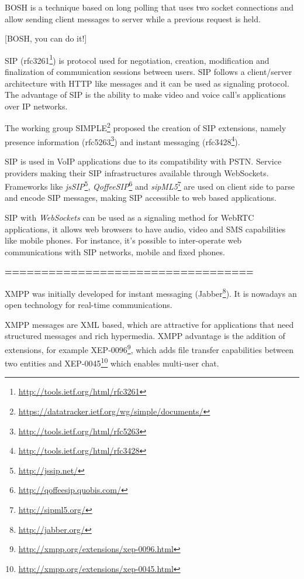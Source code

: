   \ac{BOSH} is a technique based on long polling that uses two socket connections and allow sending client messages to server while a previous request is held.

{\color{magenta} [BOSH, you can do it!]}

  \ac{SIP} (rfc3261\footnote{\url{http://tools.ietf.org/html/rfc3261}}) is protocol used for negotiation, creation, modification and finalization of communication sessions between users. \ac{SIP} follows a client/server architecture with \ac{HTTP} like messages and it can be used as signaling protocol. The advantage of \ac{SIP} is the ability to make video and voice call's applications over \ac{IP} networks.

  The working group \ac{SIMPLE}\footnote{\url{https://datatracker.ietf.org/wg/simple/documents/}} proposed the creation of \ac{SIP} extensions, namely presence information (rfc5263\footnote{\url{http://tools.ietf.org/html/rfc5263}}) and instant messaging (rfc3428\footnote{\url{http://tools.ietf.org/html/rfc3428}}).

  \ac{SIP} is used in \ac{VoIP} applications due to its compatibility with \ac{PSTN}. Service providers making their \ac{SIP} infrastructures available through WebSockets. Frameworks like \textit{jsSIP}\footnote{\url{http://jssip.net/}}, \textit{QoffeeSIP}\footnote{\url{http://qoffeesip.quobis.com/}} and \textit{sipML5}\footnote{\url{http://sipml5.org/}} are used on client side to parse and encode \ac{SIP} messages, making \ac{SIP} accessible to web based applications. 

  \ac{SIP} with \textit{WebSockets} can be used as a signaling method for \ac{WebRTC} applications, it allows web browsers to have audio, video and \ac{SMS} capabilities like mobile phones. For instance, it's possible to inter-operate web communications with \ac{SIP} networks, mobile and fixed phones.

\textbf{\color{red}==================================}

  \ac{XMPP} was initially developed for instant messaging (Jabber\footnote{\url{http://jabber.org/}}). It is nowadays an open technology for real-time communications. 

  \ac{XMPP} messages are \ac{XML} based, which are attractive for applications that need structured messages and rich hypermedia. \ac{XMPP} advantage is the addition of extensions, for example XEP-0096\footnote{\url{http://xmpp.org/extensions/xep-0096.html}}, which adds file transfer capabilities between two entities and XEP-0045\footnote{\url{http://xmpp.org/extensions/xep-0045.html}} which enables multi-user chat.


